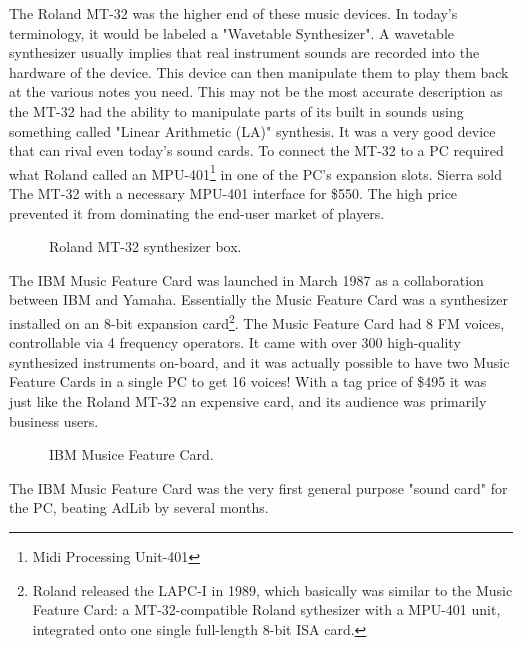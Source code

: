 \documentclass[book.tex]{subfiles}
\begin{document}
\par
The Roland MT-32 was the higher end of these music devices. In today's terminology, it would be labeled a "Wavetable Synthesizer". A wavetable synthesizer usually implies that real instrument sounds are recorded into the hardware of the device. This device can then manipulate them to play them back at the various notes you need. This may not be the most accurate description as the MT-32 had the ability to manipulate parts of its built in sounds using something called "Linear Arithmetic (LA)" synthesis. It was a very good device that can rival even today's sound cards. To connect the MT-32 to a PC required what Roland called an MPU-401\footnote{Midi Processing Unit-401} in one of the PC's expansion slots. Sierra sold The MT-32 with a necessary MPU-401 interface for \$550. The high price prevented it from dominating the end-user market of players.\\

\par
  \begin{figure}[H] 
    \centering 
    \caption{Roland MT-32 synthesizer box.}
  \end{figure}


\par
The IBM Music Feature Card was launched in March 1987 as a collaboration between IBM and Yamaha. Essentially the Music Feature Card was a synthesizer installed on an 8-bit expansion card\footnote{Roland released the LAPC-I in 1989, which basically was similar to the Music Feature Card: a MT-32-compatible Roland sythesizer with a MPU-401 unit, integrated onto one single full-length 8-bit ISA card.}. The Music Feature Card had 8 FM voices, controllable via 4 frequency operators. It came with over 300 high-quality synthesized instruments on-board, and it was actually possible to have two Music Feature Cards in a single PC to get 16 voices! With a tag price of \$495 it was just like the Roland MT-32 an expensive card, and its audience was primarily business users.\\

\par
  \begin{figure}[H] 
    \centering 
    \caption{IBM Musice Feature Card.}
  \end{figure}

\par
   The IBM Music Feature Card was the very first general purpose "sound card" for the PC, beating AdLib by several months. \\
\end{document}
